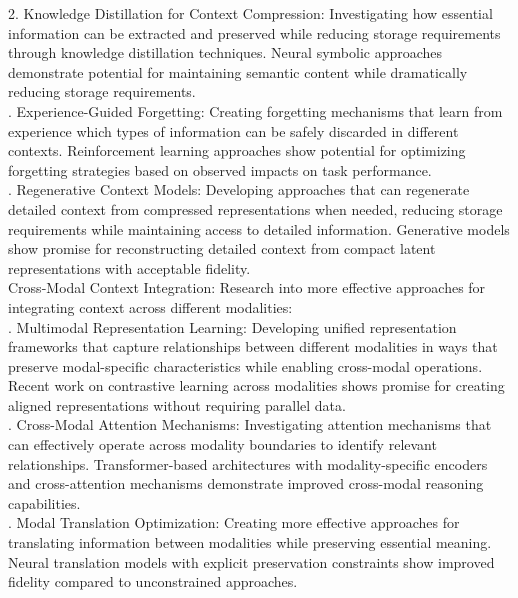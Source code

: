 2. Knowledge Distillation for Context Compression: Investigating how essential information can be extracted and preserved while reducing storage requirements through knowledge distillation techniques. Neural symbolic approaches demonstrate potential for maintaining semantic content while dramatically reducing storage requirements.\\ . Experience-Guided Forgetting: Creating forgetting mechanisms that learn from experience which types of information can be safely discarded in different contexts. Reinforcement learning approaches show potential for optimizing forgetting strategies based on observed impacts on task performance.\\ . Regenerative Context Models: Developing approaches that can regenerate detailed context from compressed representations when needed, reducing storage requirements while maintaining access to detailed information. Generative models show promise for reconstructing detailed context from compact latent representations with acceptable fidelity.\\ \newline
Cross-Modal Context Integration: Research into more effective approaches for integrating context across different modalities:\\ . Multimodal Representation Learning: Developing unified representation frameworks that capture relationships between different modalities in ways that preserve modal-specific characteristics while enabling cross-modal operations. Recent work on contrastive learning across modalities shows promise for creating aligned representations without requiring parallel data.\\ . Cross-Modal Attention Mechanisms: Investigating attention mechanisms that can effectively operate across modality boundaries to identify relevant relationships. Transformer-based architectures with modality-specific encoders and cross-attention mechanisms demonstrate improved cross-modal reasoning capabilities.\\ . Modal Translation Optimization: Creating more effective approaches for translating information between modalities while preserving essential meaning. Neural translation models with explicit preservation constraints show improved fidelity compared to unconstrained approaches.\\ \newline
